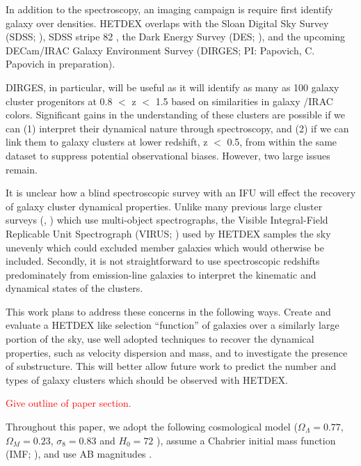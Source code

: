\documentclass[apj, revtex4]{emulateapj}
\newcommand{\editorial}[1]{\textcolor{red}{#1}}
\newcommand{\citeeg}[1]{(\eg, \citealt{#1})}
\begin{document}
In addition to the spectroscopy, an imaging campaign is require first identify galaxy over densities. HETDEX overlaps with the Sloan Digital Sky Survey (SDSS; \citealt{Blanton2001a}), SDSS stripe 82 \citep{Annis2014}, the Dark Energy Survey (DES; \citealt{DES2005}), and the upcoming DECam/IRAC Galaxy Environment Survey (DIRGES; PI: Papovich, C. Papovich \etal in preparation).

DIRGES, in particular, will be useful as it will identify as many as 100 galaxy cluster progenitors at 0.8 $<$ z $<$ 1.5 based on similarities in galaxy \spitzer/IRAC colors. Significant gains in the understanding of these clusters are possible if we can (1) interpret their dynamical nature through spectroscopy, and (2) if we can link them to galaxy clusters at lower redshift, z $<$ 0.5, from within the same dataset to suppress potential observational biases. However, two large issues remain.

It is unclear how a blind spectroscopic survey with an IFU will effect the recovery of galaxy cluster dynamical properties. Unlike many previous large cluster surveys \citeeg{Milvang-Jensen2008, Robotham2011, Sifon2015} which use multi-object spectrographs, the Visible Integral-Field Replicable Unit Spectrograph (VIRUS; \citealt{Hill2012}) used by HETDEX samples the sky unevenly which could excluded member galaxies which would otherwise be included. Secondly, it is not straightforward to use spectroscopic redshifts predominately from emission-line galaxies to interpret the kinematic and dynamical states of the clusters.

This work plans to address these concerns in the following ways. Create and evaluate a HETDEX like selection ``function'' of galaxies over a similarly large portion of the sky, use well adopted techniques to recover the dynamical properties, such as velocity dispersion and mass, and to investigate the presence of substructure. This will better allow future work to predict the number and types of galaxy clusters which should be observed with HETDEX.

\editorial{Give outline of paper section.}

Throughout this paper, we adopt the following cosmological model ($\Omega_\Lambda = 0.77$,
$\Omega_M = 0.23$, $\sigma_8 = 0.83$ and $H_0= 72$ \kms \mpc), assume a Chabrier initial mass function (IMF; \citealt{Chabrier2003}), and use AB magnitudes \citep{Oke1974}.
\end{document}
